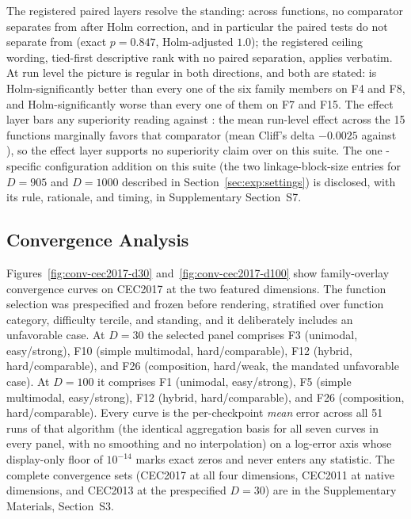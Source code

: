 The registered paired layers resolve the standing: across functions, no
comparator separates from \dtgsk{} after Holm correction, and in
particular the paired tests do not separate \dtgsk{} from \agsk{} (exact
$p = 0.847$, Holm-adjusted $1.0$); the registered ceiling wording,
tied-first descriptive rank with no paired separation, applies verbatim.
At run level the picture is regular in both directions, and both are
stated: \dtgsk{} is Holm-significantly better than every one of the six
family members on F4 and F8, and Holm-significantly worse than every one
of them on F7 and F15.
The effect layer bars any superiority reading against \atmals{}: the
mean run-level effect across the 15 functions marginally favors that
comparator (mean Cliff's delta $-0.0025$ against \dtgsk{}), so the
effect layer supports no superiority claim over \atmals{} on this suite.
The one \dtgsk{}-specific configuration addition on this suite (the
two linkage-block-size entries for $D = 905$ and $D = 1000$ described in
Section~\ref{sec:exp:settings}) is disclosed, with its rule,
rationale, and timing, in Supplementary Section~S7.

\subsection{Convergence Analysis}\label{sec:exp:convergence}

Figures~\ref{fig:conv-cec2017-d30} and~\ref{fig:conv-cec2017-d100}
show family-overlay convergence curves on CEC2017 at the two featured
dimensions. The function selection was prespecified and frozen
before rendering, stratified over function category, difficulty tercile, and
\dtgsk{} standing, and it deliberately includes an unfavorable case.
At $D = 30$ the selected panel comprises F3 (unimodal, easy/strong),
F10 (simple multimodal, hard/comparable), F12 (hybrid, hard/comparable),
and F26 (composition, hard/weak, the mandated unfavorable case).
At $D = 100$ it comprises F1 (unimodal, easy/strong),
F5 (simple multimodal, easy/strong), F12 (hybrid, hard/comparable),
and F26 (composition, hard/comparable).
Every curve is the per-checkpoint \emph{mean} error across all 51
runs of that algorithm (the identical aggregation basis for all
seven curves in every panel, with no smoothing and no
interpolation) on a log-error axis whose display-only floor of
$10^{-14}$ marks exact zeros and never enters any statistic. The
complete convergence sets (CEC2017 at all four dimensions, CEC2011
at native dimensions, and CEC2013 at the prespecified $D = 30$) are
in the Supplementary Materials, Section~S3.


